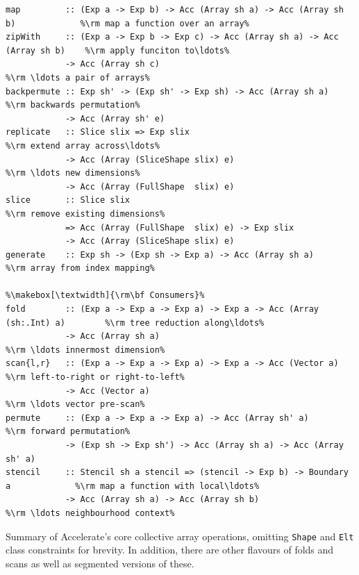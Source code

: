 \begin{table}
\begin{lstlisting}[escapechar={\%}]
%\makebox[\textwidth]{\rm\bf Producers}%
map         :: (Exp a -> Exp b) -> Acc (Array sh a) -> Acc (Array sh b)             %\rm map a function over an array%
zipWith     :: (Exp a -> Exp b -> Exp c) -> Acc (Array sh a) -> Acc (Array sh b)    %\rm apply funciton to\ldots%
            -> Acc (Array sh c)                                                     %\rm \ldots a pair of arrays%
backpermute :: Exp sh' -> (Exp sh' -> Exp sh) -> Acc (Array sh a)                   %\rm backwards permutation%
            -> Acc (Array sh' e)
replicate   :: Slice slix => Exp slix                                               %\rm extend array across\ldots%
            -> Acc (Array (SliceShape slix) e)                                      %\rm \ldots new dimensions%
            -> Acc (Array (FullShape  slix) e)
slice       :: Slice slix                                                           %\rm remove existing dimensions%
            => Acc (Array (FullShape  slix) e) -> Exp slix
            -> Acc (Array (SliceShape slix) e)
generate    :: Exp sh -> (Exp sh -> Exp a) -> Acc (Array sh a)                      %\rm array from index mapping%

%\makebox[\textwidth]{\rm\bf Consumers}%
fold        :: (Exp a -> Exp a -> Exp a) -> Exp a -> Acc (Array (sh:.Int) a)        %\rm tree reduction along\ldots%
            -> Acc (Array sh a)                                                     %\rm \ldots innermost dimension%
scan{l,r}   :: (Exp a -> Exp a -> Exp a) -> Exp a -> Acc (Vector a)                 %\rm left-to-right or right-to-left%
            -> Acc (Vector a)                                                       %\rm \ldots vector pre-scan%
permute     :: (Exp a -> Exp a -> Exp a) -> Acc (Array sh' a)                       %\rm forward permutation%
            -> (Exp sh -> Exp sh') -> Acc (Array sh a) -> Acc (Array sh' a)
stencil     :: Stencil sh a stencil => (stencil -> Exp b) -> Boundary a             %\rm map a function with local\ldots%
            -> Acc (Array sh a) -> Acc (Array sh b)                                 %\rm \ldots neighbourhood context%
\end{lstlisting}
\caption[Core Accelerate array operations]{Summary of Accelerate's core
    collective array operations, omitting \texttt{Shape} and \texttt{Elt}
    class constraints for brevity. In addition, there are other flavours of
    folds and scans as well as segmented versions of these.}
\label{tab:operations}
\end{table}


